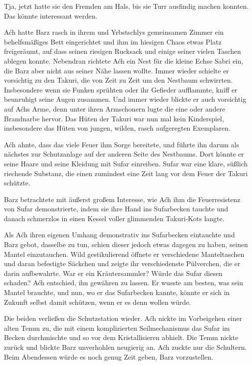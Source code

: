 Tja, jetzt hatte sie den Fremden am Hals, bis sie Turr ausfindig machen konnten. Das könnte interessant werden.



\trennzeichen



Aćh hatte Barz rasch in ihrem und Yrbstschlys gemeinsamen Zimmer ein behelfsmäßiges Bett eingerichtet und ihm im hiesigen Chaos etwas Platz freigeräumt, auf dass seinen riesigen Rucksack und einige seiner vielen Taschen ablegen konnte. Nebendran richtete Aćh ein Nest für die kleine Echse Sabri ein, die Barz aber nicht aus seiner Nähe lassen wollte. Immer wieder schielte er vorsichtig zu den Takuri, die von Zeit zu Zeit um den Nestbaum schwirrten. Insbesondere wenn sie Funken sprühten oder ihr Gefieder aufflammte, kniff er beunruhigt seine Augen zusammen. Und immer wieder blickte er auch vorsichtig auf Aćhs Arme, denn unter ihren Armschonern lugte die eine oder andere Brandnarbe hervor. Das Hüten der Takuri war nun mal kein Kinderspiel, insbesondere das Hüten von jungen, wilden, rasch aufgeregten Exemplaren.

Aćh ahnte, dass das viele Feuer ihm Sorge bereitete, und führte ihn darum als nächstes zur Schutzanlage auf der anderen Seite des Nestbaums. Dort könnte er seine Haare und seine Kleidung mit Sufar einreiben. Sufar war eine klare, süßlich riechende Substanz, die einen zumindest eine Zeit lang vor dem Feuer der Takuri schützte.

Barz betrachtete mit äußerst großem Interesse, wie Aćh ihm die Feuerresistenz von Sufar demonstrierte, indem sie ihre Hand ins Sufarbecken tauchte und danach schmerzlos in einen Kessel voller glimmenden Takuri-Kots langte.

Als Aćh ihren eigenen Umhang demonstrativ ins Sufarbecken eintauchte und Barz gebot, dasselbe zu tun, schien dieser jedoch etwas dagegen zu haben, seinen Mantel einzutauchen. Wild gestikulierend öffnete er verschiedene Manteltaschen und daran befestigte Säckchen und zeigte ihr verschiedenste Pülverchen, die er darin aufbewahrte. War er ein Kräutersammler? Würde das Sufar diesen schaden? Aćh entschied, ihn gewähren zu lassen. Er wusste am besten, was sein Mantel brauchte, und nun, wo er das Sufarbecken kannte, könnte er sich in Zukunft selbst damit schützen, wenn er es denn wollen würde.

Die beiden verließen die Schutzstation wieder. Aćh nickte im Vorbeigehen einer alten Temm zu, die mit einem komplizierten Seilmechanismus das Sufar im Becken durchmischte und so vor dem Kristallisieren abhielt. Die Temm nickte zurück und blickte Barz unverhohlen neugierig an. Aćh zuckte nur die Schultern. Beim Abendessen würde es noch genug Zeit geben, Barz vorzustellen.

